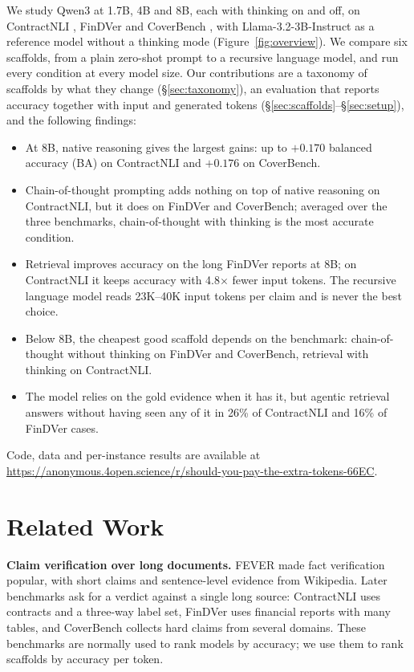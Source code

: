\documentclass[11pt]{article}
\begin{document}
We study Qwen3 \citep{yang2025qwen3} at 1.7B, 4B and 8B, each with thinking
on and off, on ContractNLI \citep{koreeda-manning-2021-contractnli}, FinDVer
\citep{zhao-etal-2024-findver} and CoverBench \citep{jacovi2024coverbench},
with Llama-3.2-3B-Instruct \citep{grattafiori2024llama3} as a reference
model without a thinking mode (Figure~\ref{fig:overview}). We compare six
scaffolds, from a plain zero-shot prompt to a recursive language model,
and run every condition at every model size. Our contributions are a
taxonomy of scaffolds by what they change (\S\ref{sec:taxonomy}), an
evaluation that reports accuracy together with input and generated
tokens (\S\ref{sec:scaffolds}--\S\ref{sec:setup}), and the following
findings:
\begin{itemize}
\setlength{\itemsep}{0pt}
\item At 8B, native reasoning gives the largest gains: up to $+0.170$
balanced accuracy (BA) on ContractNLI and $+0.176$ on CoverBench.
\item Chain-of-thought prompting adds nothing on top of native reasoning on
ContractNLI, but it does on FinDVer and CoverBench; averaged over the three
benchmarks, chain-of-thought with thinking is the most accurate condition.
\item Retrieval improves accuracy on the long FinDVer reports at 8B; on
ContractNLI it keeps accuracy with 4.8$\times$ fewer input tokens. The
recursive language model reads 23K--40K input tokens per claim and is
never the best choice.
\item Below 8B, the cheapest good scaffold depends on the benchmark:
chain-of-thought without thinking on FinDVer and CoverBench, retrieval with
thinking on ContractNLI.
\item The model relies on the gold evidence when it has it, but agentic
retrieval answers without having seen any of it in 26\% of ContractNLI and
16\% of FinDVer cases.
\end{itemize}
Code, data and per-instance results are available at
\url{https://anonymous.4open.science/r/should-you-pay-the-extra-tokens-66EC}.

\section{Related Work}
\label{sec:related}

\noindent \textbf{Claim verification over long documents.}
FEVER \citep{thorne2018fever} made fact verification popular, with short
claims and sentence-level evidence from Wikipedia. Later benchmarks ask for
a verdict against a single long source: ContractNLI
\citep{koreeda-manning-2021-contractnli} uses contracts and a three-way
label set, FinDVer \citep{zhao-etal-2024-findver} uses financial reports
with many tables, and CoverBench \citep{jacovi2024coverbench} collects hard
claims from several domains. These benchmarks are normally used to rank
models by accuracy; we use them to rank scaffolds by accuracy per token.
\end{document}
